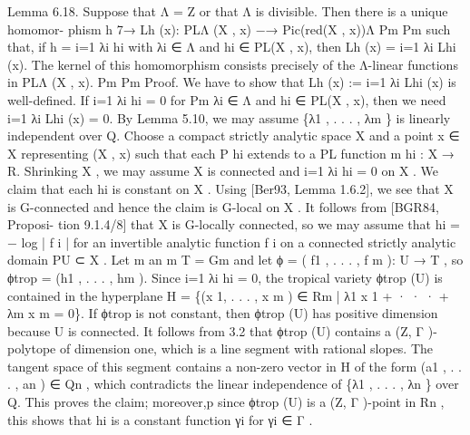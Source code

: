 \documentclass[
  10pt,
]{article}
\newenvironment{Shaded}{}{}
\newcommand{\NormalTok}[1]{#1}
\begin{document}
\begin{Shaded}
\begin{Highlighting}[]
\NormalTok{Lemma 6.18. Suppose that Λ = Z or that Λ is divisible. Then there is a unique homomor{-}}
\NormalTok{phism}
\NormalTok{                          h 7→ Lh (x): PLΛ (X , x) −→ Pic(red(X , x))Λ}
\NormalTok{                        Pm                                                           Pm}
\NormalTok{such that, if h = i=1 λi hi with λi ∈ Λ and hi ∈ PL(X , x), then Lh (x) = i=1 λi Lhi (x).}
\NormalTok{The kernel of this homomorphism consists precisely of the Λ{-}linear functions in PLΛ (X , x).}
\NormalTok{                                              Pm                                   Pm}
\NormalTok{Proof. We have to show that Lh (x) := i=1 λi Lhi (x) is well{-}defined. If i=1 λi hi = 0 for}
\NormalTok{                                                     Pm}
\NormalTok{λi ∈ Λ and hi ∈ PL(X , x), then we need i=1 λi Lhi (x) = 0. By Lemma 5.10, we may}
\NormalTok{assume \{λ1 , . . . , λm \} is linearly independent over Q. Choose a compact strictly analytic}
\NormalTok{space X and a point x ∈ X representing (X , x) such that each P         hi extends to a PL function}
\NormalTok{                                                                           m}
\NormalTok{hi : X → R. Shrinking X , we may assume X is connected and i=1 λi hi = 0 on X .}
\NormalTok{   We claim that each hi is constant on X . Using [Ber93, Lemma 1.6.2], we see that X}
\NormalTok{is G{-}connected and hence the claim is G{-}local on X . It follows from [BGR84, Proposi{-}}
\NormalTok{tion 9.1.4/8] that X is G{-}locally connected, so we may assume that hi = − log | f i | for}
\NormalTok{an invertible analytic function f i on a connected strictly analytic domain          PU  ⊂ X . Let}
\NormalTok{           m                                      an                                   m}
\NormalTok{T = Gm and let ϕ = ( f1 , . . . , f m ): U → T , so ϕtrop = (h1 , . . . , hm ). Since i=1 λi hi = 0,}
\NormalTok{the tropical variety ϕtrop (U) is contained in the hyperplane H = \{(x 1, . . . , x m ) ∈ Rm |}
\NormalTok{λ1 x 1 + · · · + λm x m = 0\}. If ϕtrop is not constant, then ϕtrop (U) has positive dimension}
\NormalTok{because U is connected. It follows from 3.2 that ϕtrop (U) contains a (Z, Γ ){-}polytope of}
\NormalTok{dimension one, which is a line segment with rational slopes. The tangent space of this}
\NormalTok{segment contains a non{-}zero vector in H of the form (a1 , . . . , an ) ∈ Qn , which contradicts}
\NormalTok{the linear independence of \{λ1 , . . . , λn \} over Q. This proves the claim; moreover,p        since}
\NormalTok{ϕtrop (U) is a (Z, Γ ){-}point in Rn , this shows that hi is a constant function γi for γi ∈ Γ .}

\end{Highlighting}
\end{Shaded}
\end{document}
